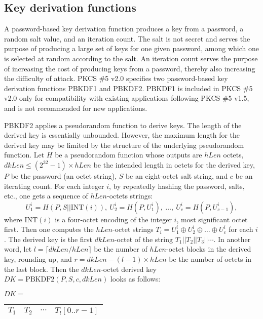 \documentclass{article}
\begin{document}
\subsection{Key derivation functions}
A password-based key derivation function
produces a key from a password, a random salt value, and an iteration count.
The salt is not secret and serves the purpose of producing a 
large set of keys for one 
given password, among which one is selected at random according to the salt. 
An iteration count serves the purpose of increasing the cost 
of producing keys from a password, thereby also increasing 
the difficulty of attack. 
PKCS \#5 v2.0 specifies two password-based key derivation functions 
PBKDF1 and PBKDF2. PBKDF1 is included in PKCS \#5 v2.0  only for 
compatibility with existing applications following PKCS \#5 v1.5, 
and is not recommended for new applications.

PBKDF2 applies a pseudorandom function to derive keys. 
The length of the derived key is essentially unbounded. 
However, the maximum length for the derived key 
may be limited by the structure of the underlying pseudorandom function. 
Let  $H$ be a pseudorandom function whose outputs are
$hLen$  octets, $dkLen\le (2^{32} - 1)\times hLen$ 
be the intended length in octets 
for the derived key, $P$ be the password (an octet string), 
$S$ be an eight-octet salt string, and $c$ be an iterating count.
For each integer $i$, by repeatedly hashing the password, salts, etc.,
one gets a sequence of $hLen$-octets strings:
$$U_1^{i} =  H(P, S ||\mbox{INT}(i)),\ 
U_2^{i} = H(P, U_1^{i}),\ 
\ldots,\  U_c^{i} = H(P, U_{c-1}^{i}),$$
where $\mbox{INT}(i)$ is a four-octet encoding of the integer $i$, 
most significant octet first. Then one computes the  $hLen$-octet strings
$T_i = U_1^{i} \oplus U_2^{i} \oplus\ldots\oplus U_c^{i}$
for each $i$. The derived key is the first  $dkLen$-octet 
of the string $T_1||T_2||T_3||\cdots$. In another word, 
let $l =\lceil dkLen / hLen\rceil$ be the number of $hLen$-octet blocks
in the derived key, rounding up, and $r = dkLen - (l - 1)\times hLen$ be 
the number of octets in the last block.
Then the $dkLen$-octet derived key $DK=\mbox{PBKDF2}(P, S, c, dkLen)$ 
looks as follows:
\begin{center}
$DK=$ \begin{tabular}{|c|c|c|c|}\hline
$T_1$ & $T_2$ & $\cdots$ & $T_l[0..r-1]$\\ \hline
\end{tabular}
\end{center}
\end{document}
